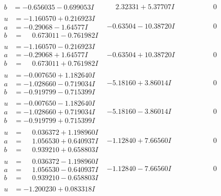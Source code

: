 \documentclass[1p]{elsarticle_modified}
\theoremstyle{definition}
\begin{document}
$$\begin{array}{c|c|c}
\begin{aligned}
b &= -0.656035 - 0.699053 I\end{aligned}
 & \phantom{-}2.32331 + 5.37707 I & \phantom{-0.000000 } 0 \\ \hline\begin{aligned}
u &= -1.160570 + 0.216923 I \\
a &= -0.29068 - 1.64577 I \\
b &= \phantom{-}0.673011 - 0.761982 I\end{aligned}
 & -0.63504 - 10.38720 I & \phantom{-0.000000 } 0 \\ \hline\begin{aligned}
u &= -1.160570 - 0.216923 I \\
a &= -0.29068 + 1.64577 I \\
b &= \phantom{-}0.673011 + 0.761982 I\end{aligned}
 & -0.63504 + 10.38720 I & \phantom{-0.000000 } 0 \\ \hline\begin{aligned}
u &= -0.007650 + 1.182640 I \\
a &= -1.028660 - 0.719034 I \\
b &= -0.919799 - 0.715399 I\end{aligned}
 & -5.18160 + 3.86014 I & \phantom{-0.000000 } 0 \\ \hline\begin{aligned}
u &= -0.007650 - 1.182640 I \\
a &= -1.028660 + 0.719034 I \\
b &= -0.919799 + 0.715399 I\end{aligned}
 & -5.18160 - 3.86014 I & \phantom{-0.000000 } 0 \\ \hline\begin{aligned}
u &= \phantom{-}0.036372 + 1.198960 I \\
a &= \phantom{-}1.056530 + 0.640937 I \\
b &= \phantom{-}0.939210 + 0.658803 I\end{aligned}
 & -1.12840 + 7.66560 I & \phantom{-0.000000 } 0 \\ \hline\begin{aligned}
u &= \phantom{-}0.036372 - 1.198960 I \\
a &= \phantom{-}1.056530 - 0.640937 I \\
b &= \phantom{-}0.939210 - 0.658803 I\end{aligned}
 & -1.12840 - 7.66560 I & \phantom{-0.000000 } 0 \\ \hline\begin{aligned}
u &= -1.200230 + 0.083318 I \\

\end{aligned}
\end{array}$$
\end{document}
